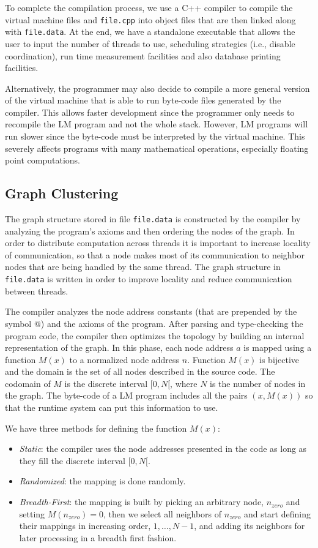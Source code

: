 To complete the compilation process, we use a C++ compiler to compile the
virtual machine files and \texttt{file.cpp} into object files that are then
linked along with \texttt{file.data}. At the end, we have a standalone
executable that allows the user to input the number of threads to use,
scheduling strategies (i.e., disable coordination), run time measurement
facilities and also database printing facilities.

Alternatively, the programmer may also decide to compile a more general version
of the virtual machine that is able to run byte-code files generated by the
compiler. This allows faster development since the programmer only needs to
recompile the LM program and not the whole stack. However, LM programs will run
slower since the byte-code must be interpreted by the virtual machine. This
severely affects programs with many mathematical operations, especially floating
point computations.

\subsection{Graph Clustering}

The graph structure stored in file \texttt{file.data} is constructed by the
compiler by analyzing the program's axioms and then ordering the nodes of the
graph.  In order to distribute computation across threads it is important to
increase locality of communication, so that a node makes most of its
communication to neighbor nodes that are being handled by the same thread. The
graph structure in \texttt{file.data} is written in order to improve locality
and reduce communication between threads.

The compiler analyzes the node address constants (that are prepended by the
symbol @) and the axioms of the program. After parsing and type-checking the
program code, the compiler then optimizes the topology by building an internal
representation of the graph.  In this phase, each node address $a$ is mapped
using a function $M(x)$ to a normalized node address $n$. Function $M(x)$ is
bijective and the domain is the set of all nodes described in the source code.
The codomain of $M$ is the discrete interval $[0, N[$, where $N$ is the number
of nodes in the graph. The byte-code of a LM program includes all the pairs $(x,
M(x))$ so that the runtime system can put this information to use.

We have three methods for defining the function $M(x)$:

\begin{itemize}
   \item \emph{Static}: the compiler uses the node addresses presented in the
      code as long as they fill the discrete interval $[0, N[$.
   \item \emph{Randomized}: the mapping is done randomly.
   \item \emph{Breadth-First}: the mapping is built by picking an arbitrary node, $n_{zero}$
   and setting $M(n_{zero}) = 0$, then we select all neighbors of $n_{zero}$ and start defining
   their mappings in increasing order, $1, \dotsc, N-1$, and adding its neighbors for later processing
   in a breadth first fashion.
\end{itemize}

